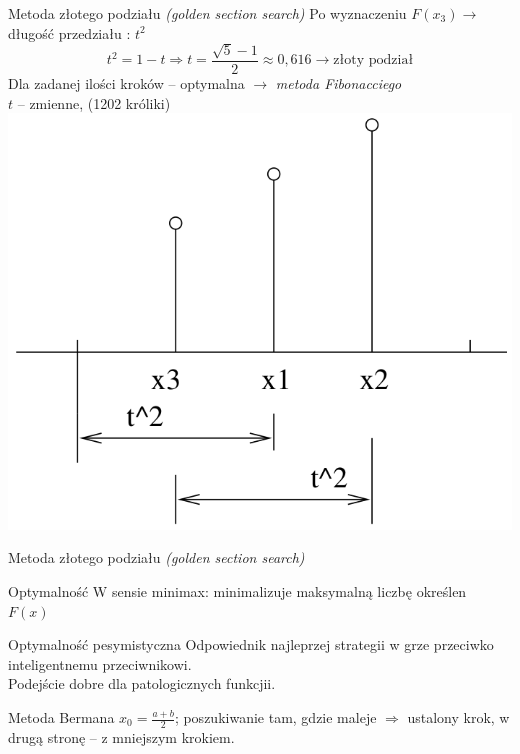   \begin{frame}{Metoda złotego podziału \emph{(golden section search)}}
    Po wyznaczeniu $F(x_3) \to$ długość przedziału : $t^{2}$
    \begin{displaymath}
      t^{2} = 1 - t \Rightarrow t = \frac{\sqrt{5} - 1}{2} \approx 0,616 \to \text{złoty podział}
    \end{displaymath}
    Dla zadanej ilości kroków -- optymalna $\to$ \emph{metoda Fibonacciego}\\
    $t$ -- zmienne, (1202 króliki)\\
    \centering
    \includegraphics[height=0.55\textheight]{img/17/fibb}
  \end{frame}

  \begin{frame}{Metoda złotego podziału \emph{(golden section search)}}
    \begin{block}{Optymalność}
      W sensie minimax: minimalizuje maksymalną liczbę określen
      $F(x)$
    \end{block}
    \begin{block}{Optymalność pesymistyczna}
      Odpowiednik najleprzej strategii w grze przeciwko
      inteligentnemu przeciwnikowi.\\
      Podejście dobre dla patologicznych funkcjii.
    \end{block}
    \begin{block}{Metoda Bermana}
      $x_{0} = \frac{a + b}{2}$; poszukiwanie tam, gdzie maleje
      $\Rightarrow$ ustalony krok, w drugą stronę -- z mniejszym krokiem.
    \end{block}
  \end{frame}

